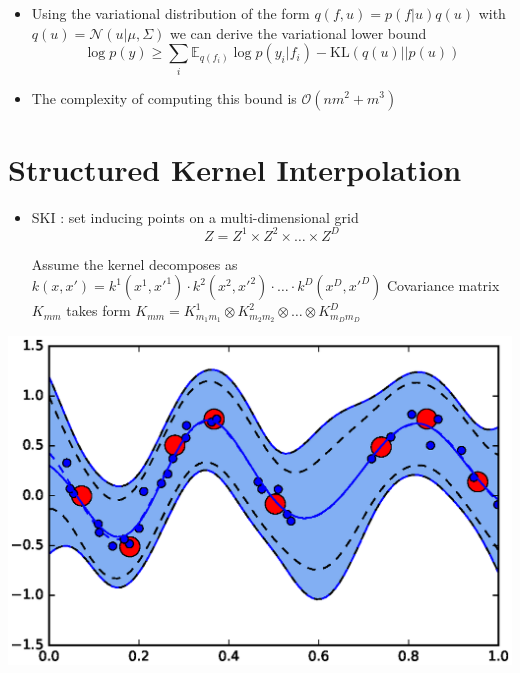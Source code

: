 \documentclass[a0,portrait]{a0poster}
\newcommand{\E}{\mathbb{E}}
\newcommand{\N}{\mathcal{N}}
\newcommand{\bigO}{\mathcal{O}}
\newcommand{\KL}[2]{\mbox{KL}\left(#1\vert \vert#2\right)}
\begin{document}
\begin{multicols}{2}
\begin{itemize}
  \item Using the variational distribution of the form 
    $
      q(f, u) = p(f \vert u) q(u)
    $
    with $q(u) = \N(u \vert \mu, \Sigma)$ we can derive the variational lower bound
    \[
      \log p(y) \ge \sum_i \E_{q(f_i)} \log p(y_i \vert f_i) - \KL{q(u)}{p(u)}
    \]
  
  \item The complexity of computing this bound is $\bigO(nm^2 + m^3)$
\end{itemize}

\section*{\LARGE \color{NavyBlue}Structured Kernel Interpolation}
  
\begin{itemize}
  \item SKI \citep{wilson2015}: set inducing points on a multi-dimensional grid
    \[
      Z = Z^1 \times Z^2 \times \ldots \times Z^D
    \]
  
    Assume the kernel decomposes as
    $
      k(x, x') = k^1(x^1, x'^1) \cdot k^2(x^2, x'^2) \cdot \ldots \cdot k^D(x^D, x'^D)
    $
    Covariance matrix $K_{mm}$ takes form
    $
      K_{mm} = K_{m_1 m_1}^1 \otimes K_{m_2 m_2}^2 \otimes \ldots \otimes K_{m_D m_D}^D
    $ 

\end{itemize}
\begin{minipage}[b]{0.45\linewidth}

  \begin{center}
    \includegraphics[width=1.\linewidth]{pics/gps/1d_gp_ind_inputs.eps}
  \end{center}


\end{minipage}
\end{multicols}
\end{document}
